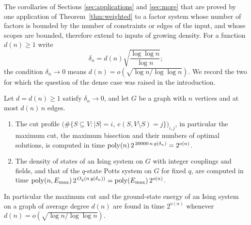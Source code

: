 The corollaries of Sections \ref{sec:applications} and \ref{sec:more} that are
proved by one application of Theorem~\ref{thm:weighted} to a factor system whose
number of factors is bounded by the number of constraints or edges of the input,
and whose scopes are bounded, therefore extend to inputs of growing density. For a
function $d(n)\ge1$ write
\[
  \delta_n=d(n)\sqrt{\frac{\log\log n}{\log n}} ;
\]
the condition $\delta_n\to0$ means $d(n)=o(\sqrt{\log n/\log\log n})$. We record the
two for which the question of the dense case was raised in the introduction.

\begin{corollary}\label{cor:density}
Let $d=d(n)\ge1$ satisfy $\delta_n\to0$, and let $G$ be a graph with $n$ vertices and
at most $d(n)\,n$ edges.
\begin{enumerate}[label=(\roman*),leftmargin=2.2em]
\item\label{it:densecut} The cut profile $\bigl(\#\{S\subseteq V:|S|=i,\
e(S,V\setminus S)=j\}\bigr)_{i,j}$, in particular the maximum cut, the maximum
bisection and their numbers of optimal solutions, is computed in time
$\operatorname{poly}(n)\,2^{\,20000\,n\,g(\delta_n)}=2^{o(n)}$.
\item\label{it:denseising} The density of states of an Ising system on $G$
with integer couplings and fields, and that of the $q$-state Potts system on
$G$ for fixed $q$, are computed in time
$\operatorname{poly}(n,E_{\max})\,2^{\,O_q(n\,g(\delta_n))}=\operatorname{poly}(E_{\max})\,2^{o(n)}$.
\end{enumerate}
In particular the maximum cut and the ground-state energy of an Ising system on
a graph of average degree $d(n)$ are found in time $2^{o(n)}$ whenever
$d(n)=o(\sqrt{\log n/\log\log n})$.
\end{corollary}


